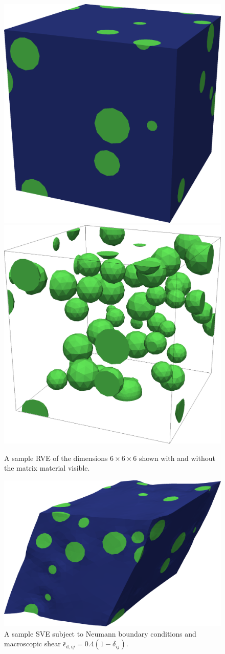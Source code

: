 \documentclass[12pt,a4paper]{article}
\renewcommand{\dev}{\mathrm{d}}
\begin{document}
\begin{figure}[H]
\centering
 \includegraphics[width=0.45\linewidth]{rve6.png}
 \includegraphics[width=0.45\linewidth]{rve6_inc.png}
\caption{A sample RVE of the dimensions $6\times6\times6$ shown with and without the matrix material visible.}
\label{fig:initial_rve6}
\end{figure}

\begin{figure}[htpb!]
\centering
 \includegraphics[width=0.6\linewidth]{rve6_def.png}
\caption{A sample SVE subject to Neumann boundary conditions and macroscopic shear $\bar{\epsilon}_{\dev,ij} = 0.4(1 - \delta_{ij})$.}
\label{fig:def_rve6}
\end{figure}
\end{document}
